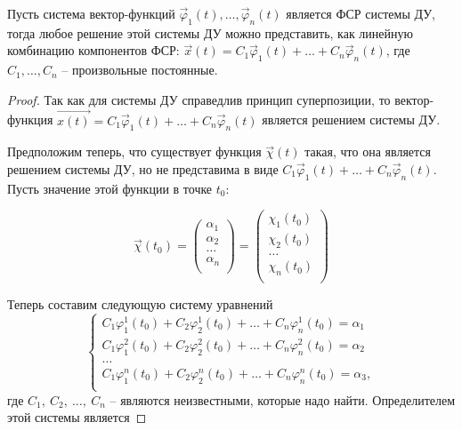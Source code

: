 \begin{theorem}
    Пусть система вектор-функций $\overrightarrow \varphi_1(t), \dots, \overrightarrow \varphi_n(t)$ является ФСР системы ДУ, тогда
    любое решение этой системы ДУ можно представить, как линейную комбинацию компонентов ФСР: 
    $\overrightarrow x(t) = C_1 \overrightarrow \varphi_1(t) + \dots + C_n \overrightarrow \varphi_n(t)$, где $C_1, \dots, C_n$ -- произвольные постоянные.
\end{theorem}
\begin{proof}
    Так как для системы ДУ справедлив принцип суперпозиции, то вектор-функция $\overrightarrow{x(t)} = C_1 \overrightarrow \varphi_1(t) + \dots + C_n \overrightarrow \varphi_n(t)$ является решением системы ДУ.
    
    Предположим теперь, что существует функция $\overrightarrow{\chi}(t)$ такая, что она является решением системы ДУ, но не представима в виде $C_1 \overrightarrow \varphi_1(t) + \dots + C_n \overrightarrow \varphi_n(t)$. Пусть значение этой функции в точке $t_0$:
    
    \begin{equation}
        \overrightarrow{\chi}(t_0) = 
        \begin{pmatrix}
            \alpha_1 \\
            \alpha_2 \\
            \dots \\
            \alpha_n \\
        \end{pmatrix} = 
        \begin{pmatrix}
            \chi_1(t_0) \\
            \chi_2(t_0) \\
            \dots \\
            \chi_n(t_0) \\
        \end{pmatrix}
    \end{equation}
    
    Теперь составим следующую систему уравнений
    \begin{equation}
        \begin{cases}
            C_1 \varphi_1^1(t_0) + C_2 \varphi_2^1(t_0) + \dots + C_n \varphi_n^1(t_0) = \alpha_1 \\
            C_1 \varphi_1^2(t_0) + C_2 \varphi_2^2(t_0) + \dots + C_n \varphi_n^2(t_0) = \alpha_2 \\
            \dots \\
            C_1 \varphi_1^n(t_0) + C_2 \varphi_2^n(t_0) + \dots + C_n \varphi_n^n(t_0) = \alpha_3, \\
        \end{cases}
    \end{equation}
    где $C_1, ~ C_2, ~ \dots, ~ C_n$ -- являются неизвестными, которые надо найти. Определителем этой системы является
    

\end{proof}
